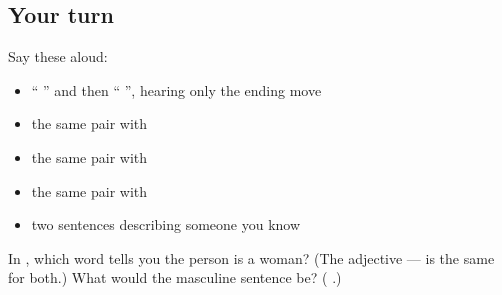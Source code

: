 \subsection*{Your turn}
Say these aloud:

\begin{itemize}
\raggedright
  \item \textquotedblleft{}  \textquotedblright{} and then \textquotedblleft{}  \textquotedblright{}, hearing only the ending move
  \item the same pair with \textbf{}
  \item the same pair with \textbf{}
  \item the same pair with \textbf{}
  \item two sentences describing someone you know
\end{itemize}

\begin{tcolorbox}[breakable,colback=teal!4,colframe=teal!35!black,title={Before you move on}]
In \textbf{  }, which word tells you the person is a woman? (The adjective — \textbf{} is the same for both.) What would the masculine sentence be? (\textbf{  }.)
\end{tcolorbox}
